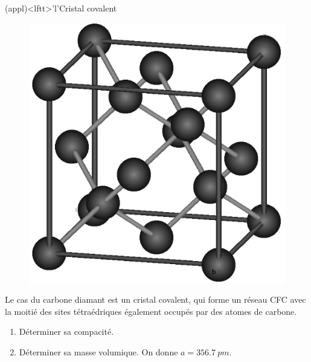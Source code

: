 \documentclass[../../main/main.tex]{subfiles}
\begin{document}
\begin{tcb*}(appl)<lftt>'l'{Cristal covalent}
	\begin{figure}
		\vspace*{-20pt}
		\centering
		\includegraphics[width=.8\linewidth]{maille_diamant}
	\end{figure}
	Le cas du carbone diamant est un cristal covalent, qui forme un réseau CFC
	avec la moitié des sites tétraédriques également occupés par des atomes de
	carbone.
	\begin{enumerate}
		\item Déterminer sa compacité.
		\item Déterminer sa masse volumique. On donne $a = \SI{356.7}{pm}$.
	\end{enumerate}
	\tcblower
	\vspace{-15pt}
\end{tcb*}
\end{document}
